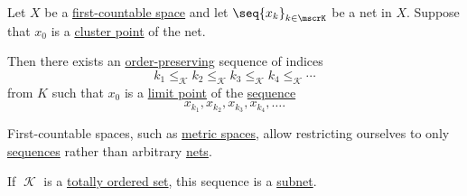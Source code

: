 \begin{proposition}\label{thm:first_countable_space_limit_points}
  Let \( X \) be a \hyperref[def:topological_space_character]{first-countable space} and let \( \seq{ x_k }_{k \in \mscrK} \) be a net in \( X \). Suppose that \( x_0 \) is a \hyperref[def:net_cluster_point]{cluster point} of the net.

  Then there exists an \hyperref[def:order_homomorphism/increasing]{order-preserving} sequence of indices
  \begin{equation*}
    k_1 \leq_\mscrK k_2 \leq_\mscrK k_3 \leq_\mscrK k_4 \leq_\mscrK \cdots
  \end{equation*}
  from \( K \) such that \( x_0 \) is a \hyperref[def:net_limit_point]{limit point} of the \hyperref[def:sequence]{sequence}
  \begin{equation*}
    x_{k_1}, x_{k_2}, x_{k_3}, x_{k_4}, \ldots.
  \end{equation*}
\end{proposition}
\begin{comments}
  \item First-countable spaces, such as \hyperref[def:metric_space]{metric spaces}, allow restricting ourselves to only \hyperref[def:sequence]{sequences} rather than arbitrary \hyperref[def:topological_net]{nets}.
  \item If \( \mscrK \) is a \hyperref[def:totally_ordered_set]{totally ordered set}, this sequence is a \hyperref[def:subnet]{subnet}.
\end{comments}
